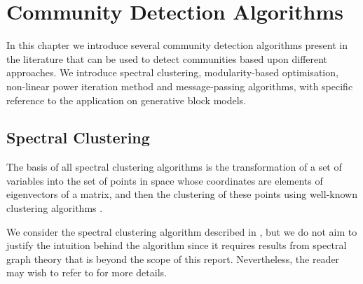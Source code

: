 
\chapter{Community Detection Algorithms}

\label{cha:communityDetectionAlgorithms}


In this chapter we introduce several community detection algorithms present in the literature that can be used to detect communities based upon different approaches.
We introduce spectral clustering, modularity-based optimisation, non-linear power iteration method and message-passing algorithms, with specific reference to the application on generative block models.


\section{Spectral Clustering}
\label{sec:spectralClustering}

The basis of all spectral clustering algorithms is the transformation of a set of variables into the set of points in space whose coordinates are elements of eigenvectors of a matrix, and then the clustering of these points using well-known clustering algorithms \cite{Lux06,For10}.


We consider the spectral clustering algorithm described in \cite{Lux06,For10}, but we do not aim to justify the intuition behind the algorithm since it requires results from spectral graph theory that is beyond the scope of this report.
Nevertheless, the reader may wish to refer to \cite{Lux06,Spi07,For10} for more details.

